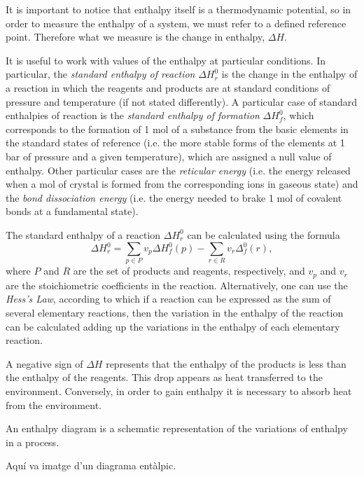 \documentclass[a4paper,10pt]{article}
\theoremstyle{plain}
\theoremstyle{definition}
\theoremstyle{remark}
\begin{document}
It is important to notice that enthalpy itself is a thermodynamic potential, so in order to measure the enthalpy of a system, we must refer to a defined reference point. Therefore what we measure is the change in enthalpy, $\Delta H$.

It is useful to work with values of the enthalpy at particular conditions. In particular, the \textit{standard enthalpy of reaction} $\Delta H_r^0$ is the change in the enthalpy of a reaction in which the reagents and products are at standard conditions of pressure and temperature (if not stated differently). A particular case of standard enthalpies of reaction is the \textit{standard enthalpy of formation} $\Delta H_f^0$, which corresponds to the formation of 1 mol of a substance from the basic elements in the standard states of reference (i.e. the more stable forms of the elements at 1 bar of pressure and a given temperature), which are assigned a null value of enthalpy. Other particular cases are the \textit{reticular energy} (i.e. the energy released when a mol of crystal is formed from the corresponding ions in gaseous state) and the \textit{bond dissociation energy} (i.e. the energy needed to brake 1 mol of covalent bonds at a fundamental state).

The standard enthalpy of a reaction $\Delta H_r^0$ can be calculated using the formula
\begin{equation}
\Delta H_r^0=\sum_{p\in P}v_p\Delta H_f^0(p) - \sum_{r\in R} v_r\Delta_f^0(r),
\end{equation}
where $P$ and $R$ are the set of products and reagents, respectively, and $v_p$ and $v_r$ are the stoichiometric coefficients in the reaction. Alternatively, one can use the \textit{Hess's Law}, according to which if a reaction can be expressed as the sum of several elementary reactions, then the variation in the enthalpy of the reaction can be calculated adding up the variations in the enthalpy of each elementary reaction.

A negative sign of $\Delta H$ represents that the enthalpy of the products is less than the enthalpy of the reagents. This drop appears as heat transferred to the environment. Conversely, in order to gain enthalpy it is necessary to absorb heat from the environment.

An enthalpy diagram is a schematic representation of the variations of enthalpy in a process.

{\color{red}Aquí va imatge d'un diagrama entàlpic.}
\end{document}
